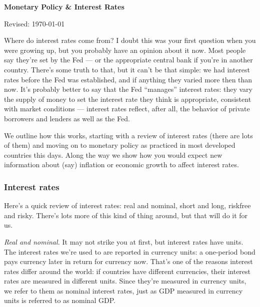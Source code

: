 \documentclass[letterpaper,12pt]{article}
\def\HeadName{Monetary Policy \& Interest Rates}
\begin{document}
\thispagestyle{empty}%
\Head

\centerline{\large \bf \HeadName}%
\centerline{Revised: \today}

\bigskip
Where do interest rates come from?
I doubt this was your first question when you were growing up,
but you probably have an opinion about it now.
Most people say they're set by the Fed ---
or the appropriate central bank if you're in another country.
There's some truth to that, but it can't be that simple:
we had interest rates before the Fed was established,
and if anything they varied more then than now.
It's probably better to say that the Fed ``manages'' interest
rates:  they vary the supply of money to set the interest rate
they think is appropriate, consistent with market conditions ---
interest rates reflect, after all, the behavior of private
borrowers and lenders as well as the Fed.

We outline how this works, starting with
a review of interest rates (there are lots of them)
and moving on to monetary policy as practiced in most
developed countries this days.
Along the way we show how you would expect new information
about (say) inflation or economic growth to affect interest rates.

\begin{comment}
*** predictability critical...

Commitment devices...
Gold and commodity money?  fixed exch rate?
Independent central bank?
\end{comment}


\subsubsection*{Interest rates}

Here's a quick review of interest rates:  real and nominal,
short and long, riskfree and risky.
There's lots more of this kind of thing around,
but that will do it for us.

{\it Real and nominal.\/}
It may not strike you at first, but interest rates have units.
The  interest rates we're used to are reported in currency units:
a one-period bond pays currency later in return for
currency now.
That's one of the reasons interest rates differ around the world:
if countries have different currencies, their interest rates
are measured in different units.
Since they're measured in currency units, we refer to them
as nominal interest rates, 
just as GDP measured in currency units is referred to
as nominal GDP.
\end{document}
